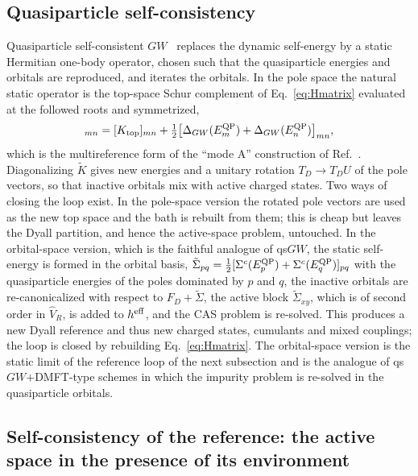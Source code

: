 \documentclass[11pt,a4paper]{article}
\newcommand{\GW}{$GW$}
\begin{document}
\subsection{Quasiparticle self-consistency}
\label{sec:qs}

Quasiparticle self-consistent \GW{}~\cite{Faleev2004,Kotani2007} replaces
the dynamic self-energy by a static Hermitian one-body operator, chosen such
that the quasiparticle energies and orbitals are reproduced, and iterates the
orbitals.  In the pole space the natural static operator is the top-space
Schur complement of Eq.~\eqref{eq:Hmatrix} evaluated at the followed roots
and symmetrized,
\begin{equation}
  [\tilde K]_{mn}=[K_{\rm top}]_{mn}
  +\tfrac12\bigl[\Delta_{GW}(E_m^{\rm QP})+\Delta_{GW}(E_n^{\rm QP})\bigr]_{mn},
  \label{eq:qs}
\end{equation}
which is the multireference form of the ``mode A'' construction of
Ref.~\cite{Kotani2007}.  Diagonalizing $\tilde K$ gives new energies and a
unitary rotation $T_D\to T_DU$ of the pole vectors, so that inactive
orbitals mix with active charged states.  Two ways of closing the loop
exist.  In the pole-space version the rotated pole vectors are used as the
new top space and the bath is rebuilt from them; this is cheap but leaves the
Dyall partition, and hence the active-space problem, untouched.  In the
orbital-space version, which is the faithful analogue of qs\GW{}, the static
self-energy is formed in the orbital basis,
$\tilde\Sigma_{pq}=\tfrac12[\Sigma^c(E_p^{\rm QP})+\Sigma^c(E_q^{\rm QP})]_{pq}$
with the quasiparticle energies of the poles dominated by $p$ and $q$, the
inactive orbitals are re-canonicalized with respect to $F_D+\tilde\Sigma$,
the active block $\tilde\Sigma_{xy}$, which is of second order in $\hat V_R$,
is added to $h^{\rm eff}$, and the CAS problem is re-solved.  This produces a
new Dyall reference and thus new charged states, cumulants and mixed
couplings; the loop is closed by rebuilding Eq.~\eqref{eq:Hmatrix}.  The
orbital-space version is the static limit of the reference loop of the next
subsection and is the analogue of qs\GW{}$+$DMFT-type schemes in which the
impurity problem is re-solved in the quasiparticle orbitals.

\subsection{Self-consistency of the reference: the active space in the
presence of its environment}
\label{sec:outer}
\end{document}

